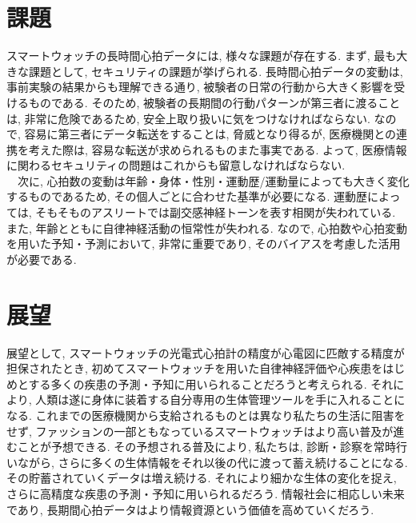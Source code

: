 \documentclass[report, 11pt, a4paper]{jsbook}
\begin{document}
\section{課題}
スマートウォッチの長時間心拍データには, 様々な課題が存在する. まず, 最も大きな課題として, セキュリティの課題が挙げられる. 長時間心拍データの変動は, 事前実験の結果からも理解できる通り, 被験者の日常の行動から大きく影響を受けるものである. そのため, 被験者の長期間の行動パターンが第三者に渡ることは, 非常に危険であるため, 安全上取り扱いに気をつけなければならない. なので, 容易に第三者にデータ転送をすることは, 脅威となり得るが, 医療機関との連携を考えた際は, 容易な転送が求められるものまた事実である. よって, 医療情報に関わるセキュリティの問題はこれからも留意しなければならない. \\
　次に, 心拍数の変動は年齢・身体・性別・運動歴/運動量によっても大きく変化するものであるため, その個人ごとに合わせた基準が必要になる. 運動歴によっては, そもそものアスリートでは副交感神経トーンを表す相関が失われている. また, 年齢とともに自律神経活動の恒常性が失われる. なので, 心拍数や心拍変動を用いた予知・予測において, 非常に重要であり, そのバイアスを考慮した活用が必要である.

\section{展望}
展望として, スマートウォッチの光電式心拍計の精度が心電図に匹敵する精度が担保されたとき, 初めてスマートウォッチを用いた自律神経評価や心疾患をはじめとする多くの疾患の予測・予知に用いられることだろうと考えられる. それにより, 人類は遂に身体に装着する自分専用の生体管理ツールを手に入れることになる. これまでの医療機関から支給されるものとは異なり私たちの生活に阻害をせず, ファッションの一部ともなっているスマートウォッチはより高い普及が進むことが予想できる. その予想される普及により, 私たちは, 診断・診察を常時行いながら, さらに多くの生体情報をそれ以後の代に渡って蓄え続けることになる. その貯蓄されていくデータは増え続ける. それにより細かな生体の変化を捉え, さらに高精度な疾患の予測・予知に用いられるだろう. 情報社会に相応しい未来であり, 長期間心拍データはより情報資源という価値を高めていくだろう. \\
\end{document}
